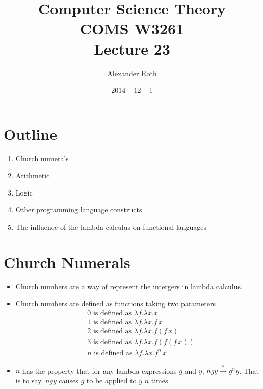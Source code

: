 \documentclass[]{article}
\begin{document}
\newtheorem{thm}{Theorem}
\title{Computer Science Theory \\ COMS W3261 \\ Lecture 23}
\author{Alexander Roth}
\date{2014 -- 12 -- 1}
\maketitle

\section*{Outline}
\begin{enumerate}
\item Church numerals
\item Arithmetic
\item Logic
\item Other programming language constructs
\item The influence of the lambda calculus on functional languages
\end{enumerate}

\section{Church Numerals}
\begin{itemize}
\item Church numbers are a way of represent the intergers in lambda calculus.
\item Church numbers are defined as functions taking two parameters
\begin{align*}
&0\,\,\textrm{is defined as}\,\,\lambda f.\lambda x.x \\
&1\,\,\textrm{is defined as}\,\,\lambda f.\lambda x.f\,x\\
&2\,\,\textrm{is defined as}\,\,\lambda f.\lambda x.f(f\,x)\\
&3\,\,\textrm{is defined as}\,\,\lambda f.\lambda x.f(f(f\,x))\\
&n\,\,\textrm{is defined as}\,\,\lambda f.\lambda x.f^n\,x
\end{align*}
\item $n$ has the property that for any lambda expressions $g$ and $y$, $ngy
\overset{*}{\rightarrow} g^ny$. That is to say, $ngy$ causes $g$ to be applied
to $y$ $n$ times.
\end{itemize}
\end{document}
